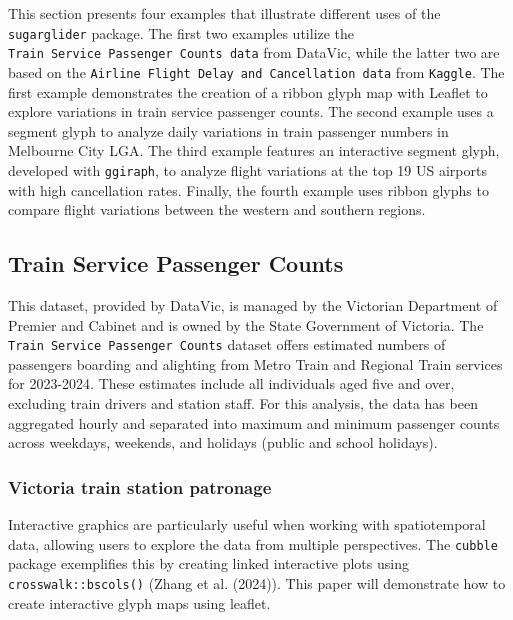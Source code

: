 This section presents four examples that illustrate different uses of the \texttt{sugarglider} package. The first two examples utilize the \texttt{Train\ Service\ Passenger\ Counts\ data} from DataVic, while the latter two are based on the \texttt{Airline\ Flight\ Delay\ and\ Cancellation\ data} from \texttt{Kaggle}. The first example demonstrates the creation of a ribbon glyph map with Leaflet to explore variations in train service passenger counts. The second example uses a segment glyph to analyze daily variations in train passenger numbers in Melbourne City LGA. The third example features an interactive segment glyph, developed with \texttt{ggiraph}, to analyze flight variations at the top 19 US airports with high cancellation rates. Finally, the fourth example uses ribbon glyphs to compare flight variations between the western and southern regions.

\hypertarget{train-service-passenger-counts}{%
\subsection{Train Service Passenger Counts}\label{train-service-passenger-counts}}

This dataset, provided by DataVic, is managed by the Victorian Department of Premier and Cabinet and is owned by the State Government of Victoria. The \texttt{Train\ Service\ Passenger\ Counts} dataset offers estimated numbers of passengers boarding and alighting from Metro Train and Regional Train services for 2023-2024. These estimates include all individuals aged five and over, excluding train drivers and station staff. For this analysis, the data has been aggregated hourly and separated into maximum and minimum passenger counts across weekdays, weekends, and holidays (public and school holidays).

\hypertarget{victoria-train-station-patronage}{%
\subsubsection{Victoria train station patronage}\label{victoria-train-station-patronage}}

Interactive graphics are particularly useful when working with spatiotemporal data, allowing users to explore the data from multiple perspectives. The \texttt{cubble} package exemplifies this by creating linked interactive plots using \texttt{crosswalk::bscols()} (Zhang et al. (2024)). This paper will demonstrate how to create interactive glyph maps using leaflet.

